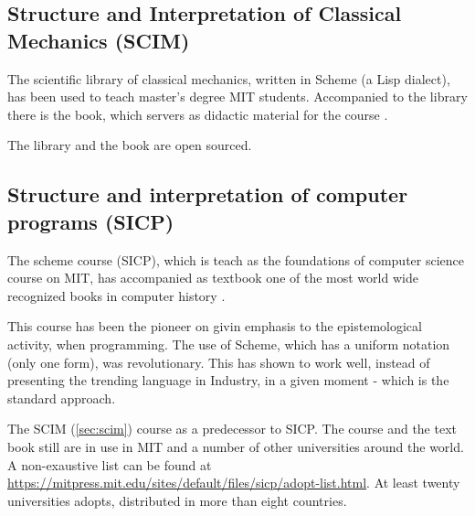 \documentclass[
12pt,				%
openright,			%
oneside,			%
a4paper,			%
brazil,				%
english,			  %
]{abntex2}
\begin{document}
\subsection{Structure and Interpretation of Classical Mechanics (SCIM)}
\label{sec:scim}
The scientific library of classical mechanics, written in Scheme (a
Lisp dialect), has been used to teach master's degree MIT
students. Accompanied to the library there is the book, which servers
as didactic material for the course \cite{sussman2015structure}.

The library and the book are open sourced.

\subsection{Structure and interpretation of computer programs (SICP)}
The scheme course (SICP), which is teach as the foundations of
computer science course on MIT, has accompanied as textbook one of the
most world wide recognized books in computer history
\cite{abelson1996structure}.

This course has been the pioneer on givin emphasis to the
epistemological activity, when programming. The use of Scheme, which
has a uniform notation (only one form), was revolutionary. This has
shown to work well, instead of presenting the trending language
in Industry, in a given moment - which is the standard approach.  

The SCIM (\autoref{sec:scim}) course as a predecessor to SICP. The course and
the text book still are in use in MIT and a number of other
universities around the world. A non-exaustive list can be found at
\url{https://mitpress.mit.edu/sites/default/files/sicp/adopt-list.html}. At
least twenty universities adopts, distributed in more than eight countries.
\end{document}
